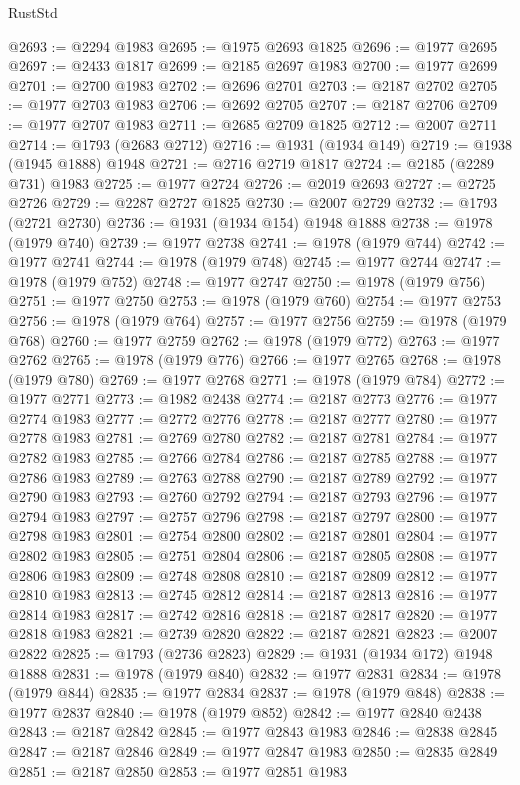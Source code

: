 \begin{lexlean}{RustStd}
\begin{coremodule}
@2693 := @2294 @1983
@2695 := @1975 @2693 @1825
@2696 := @1977 @2695
@2697 := @2433 @1817
@2699 := @2185 @2697 @1983
@2700 := @1977 @2699
@2701 := @2700 @1983
@2702 := @2696 @2701
@2703 := @2187 @2702
@2705 := @1977 @2703 @1983
@2706 := @2692 @2705
@2707 := @2187 @2706
@2709 := @1977 @2707 @1983
@2711 := @2685 @2709 @1825
@2712 := @2007 @2711
@2714 := @1793 (@2683 @2712)
@2716 := @1931 (@1934 @149)
@2719 := @1938 (@1945 @1888) @1948
@2721 := @2716 @2719 @1817
@2724 := @2185 (@2289 @731) @1983
@2725 := @1977 @2724
@2726 := @2019 @2693
@2727 := @2725 @2726
@2729 := @2287 @2727 @1825
@2730 := @2007 @2729
@2732 := @1793 (@2721 @2730)
@2736 := @1931 (@1934 @154) @1948 @1888
@2738 := @1978 (@1979 @740)
@2739 := @1977 @2738
@2741 := @1978 (@1979 @744)
@2742 := @1977 @2741
@2744 := @1978 (@1979 @748)
@2745 := @1977 @2744
@2747 := @1978 (@1979 @752)
@2748 := @1977 @2747
@2750 := @1978 (@1979 @756)
@2751 := @1977 @2750
@2753 := @1978 (@1979 @760)
@2754 := @1977 @2753
@2756 := @1978 (@1979 @764)
@2757 := @1977 @2756
@2759 := @1978 (@1979 @768)
@2760 := @1977 @2759
@2762 := @1978 (@1979 @772)
@2763 := @1977 @2762
@2765 := @1978 (@1979 @776)
@2766 := @1977 @2765
@2768 := @1978 (@1979 @780)
@2769 := @1977 @2768
@2771 := @1978 (@1979 @784)
@2772 := @1977 @2771
@2773 := @1982 @2438
@2774 := @2187 @2773
@2776 := @1977 @2774 @1983
@2777 := @2772 @2776
@2778 := @2187 @2777
@2780 := @1977 @2778 @1983
@2781 := @2769 @2780
@2782 := @2187 @2781
@2784 := @1977 @2782 @1983
@2785 := @2766 @2784
@2786 := @2187 @2785
@2788 := @1977 @2786 @1983
@2789 := @2763 @2788
@2790 := @2187 @2789
@2792 := @1977 @2790 @1983
@2793 := @2760 @2792
@2794 := @2187 @2793
@2796 := @1977 @2794 @1983
@2797 := @2757 @2796
@2798 := @2187 @2797
@2800 := @1977 @2798 @1983
@2801 := @2754 @2800
@2802 := @2187 @2801
@2804 := @1977 @2802 @1983
@2805 := @2751 @2804
@2806 := @2187 @2805
@2808 := @1977 @2806 @1983
@2809 := @2748 @2808
@2810 := @2187 @2809
@2812 := @1977 @2810 @1983
@2813 := @2745 @2812
@2814 := @2187 @2813
@2816 := @1977 @2814 @1983
@2817 := @2742 @2816
@2818 := @2187 @2817
@2820 := @1977 @2818 @1983
@2821 := @2739 @2820
@2822 := @2187 @2821
@2823 := @2007 @2822
@2825 := @1793 (@2736 @2823)
@2829 := @1931 (@1934 @172) @1948 @1888
@2831 := @1978 (@1979 @840)
@2832 := @1977 @2831
@2834 := @1978 (@1979 @844)
@2835 := @1977 @2834
@2837 := @1978 (@1979 @848)
@2838 := @1977 @2837
@2840 := @1978 (@1979 @852)
@2842 := @1977 @2840 @2438
@2843 := @2187 @2842
@2845 := @1977 @2843 @1983
@2846 := @2838 @2845
@2847 := @2187 @2846
@2849 := @1977 @2847 @1983
@2850 := @2835 @2849
@2851 := @2187 @2850
@2853 := @1977 @2851 @1983

\end{coremodule}
\end{lexlean}
